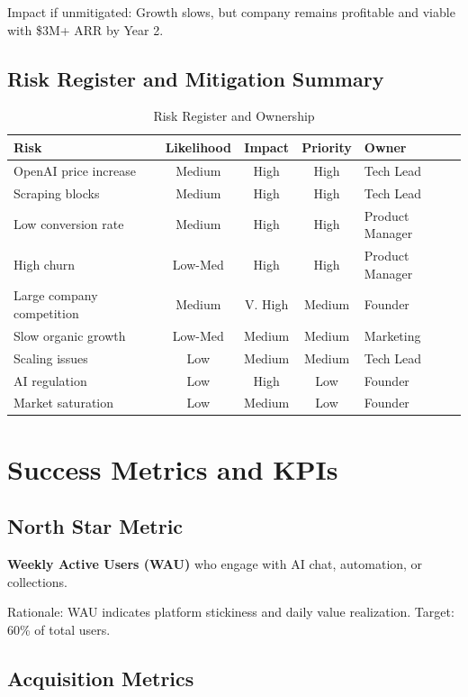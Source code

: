 \documentclass{report}
\begin{document}
Impact if unmitigated: Growth slows, but company remains profitable and viable with \$3M+ ARR by Year 2.

\section{Risk Register and Mitigation Summary}

\begin{table}[h]
\centering
\begin{tabular}{|l|c|c|c|l|}
\toprule
\textbf{Risk} & \textbf{Likelihood} & \textbf{Impact} & \textbf{Priority} & \textbf{Owner} \\
\midrule
OpenAI price increase & Medium & High & High & Tech Lead \\
Scraping blocks & Medium & High & High & Tech Lead \\
Low conversion rate & Medium & High & High & Product Manager \\
High churn & Low-Med & High & High & Product Manager \\
Large company competition & Medium & V. High & Medium & Founder \\
Slow organic growth & Low-Med & Medium & Medium & Marketing \\
Scaling issues & Low & Medium & Medium & Tech Lead \\
AI regulation & Low & High & Low & Founder \\
Market saturation & Low & Medium & Low & Founder \\
\bottomrule
\end{tabular}
\caption{Risk Register and Ownership}
\end{table}

\newpage

\chapter{Success Metrics and KPIs}

\section{North Star Metric}

\textbf{Weekly Active Users (WAU)} who engage with AI chat, automation, or collections.

Rationale: WAU indicates platform stickiness and daily value realization. Target: 60\% of total users.

\section{Acquisition Metrics}
\end{document}
